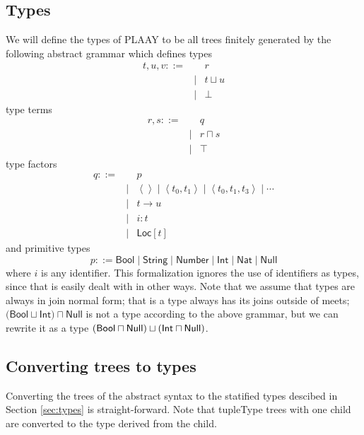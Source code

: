 \documentclass[12pt]{article}
\begin{document}
\subsection{Types\label{sec:types}}

We will define the types of PLAAY to be all trees finitely generated by the
following abstract grammar which defines types%
\begin{eqnarray*}
t,u,v::= &&r \\
&\mid &t\sqcup u \\
&\mid &\bot
\end{eqnarray*}%
type terms%
\begin{eqnarray*}
r,s::= &&q \\
&\mid &r\sqcap s \\
&\mid &\top
\end{eqnarray*}%
type factors%
\begin{eqnarray*}
q::= &&p \\
&\mid &\left\langle {}\right\rangle \mid \left\langle
t_{0},t_{1}\right\rangle \mid \left\langle t_{0},t_{1},t_{3}\right\rangle
\mid \cdots \\
&\mid &t\rightarrow u \\
&\mid &i\colon t \\
&\mid &\mathsf{Loc}[t]
\end{eqnarray*}%
and primitive types%
\begin{equation*}
p::=\mathsf{Bool\mid String\mid Number}\mid \mathsf{Int}\mid \mathsf{Nat}%
\mid \mathsf{Null}
\end{equation*}%
where $i$ is any identifier. This formalization ignores the use of
identifiers as types, since that is easily dealt with in other ways. Note
that we assume that types are always in join normal form; that is a type
always has its joins outside of meets; $(\mathsf{Bool}\sqcup \mathsf{Int}%
\mathrm{)}\sqcap \mathsf{Null}$ is not a type according to the above
grammar, but we can rewrite it as a type $\left( \mathsf{Bool}\sqcap \mathsf{%
Null}\right) \sqcup \left( \mathsf{Int}\sqcap \mathsf{Null}\right) $.

\subsection{Converting trees to types}

Converting the trees of the abstract syntax to the statified types descibed
in Section \ref{sec:types} is straight-forward. Note that tupleType trees
with one child are converted to the type derived from the child.
\end{document}

